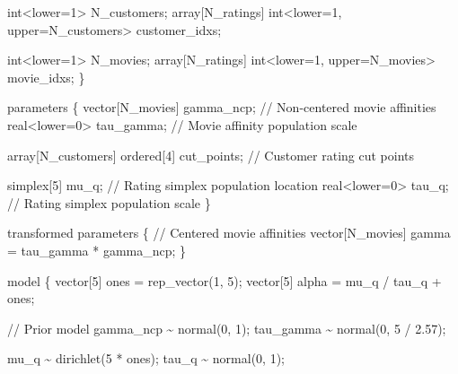 \documentclass[
  letterpaper,
  DIV=11,
  numbers=noendperiod]{scrartcl}
\newenvironment{Shaded}{\begin{snugshade}}{\end{snugshade}}
\newcommand{\CommentTok}[1]{\textcolor[rgb]{0.37,0.37,0.37}{#1}}
\newcommand{\DataTypeTok}[1]{\textcolor[rgb]{0.68,0.00,0.00}{#1}}
\newcommand{\DecValTok}[1]{\textcolor[rgb]{0.68,0.00,0.00}{#1}}
\newcommand{\FloatTok}[1]{\textcolor[rgb]{0.68,0.00,0.00}{#1}}
\newcommand{\KeywordTok}[1]{\textcolor[rgb]{0.00,0.23,0.31}{#1}}
\newcommand{\NormalTok}[1]{\textcolor[rgb]{0.00,0.23,0.31}{#1}}
\begin{document}
\begin{codelisting}
\begin{Shaded}
\begin{Highlighting}[]
  \DataTypeTok{int}\NormalTok{\textless{}}\KeywordTok{lower}\NormalTok{=}\DecValTok{1}\NormalTok{\textgreater{} N\_customers;}
  \DataTypeTok{array}\NormalTok{[N\_ratings] }\DataTypeTok{int}\NormalTok{\textless{}}\KeywordTok{lower}\NormalTok{=}\DecValTok{1}\NormalTok{, }\KeywordTok{upper}\NormalTok{=N\_customers\textgreater{} customer\_idxs;}

  \DataTypeTok{int}\NormalTok{\textless{}}\KeywordTok{lower}\NormalTok{=}\DecValTok{1}\NormalTok{\textgreater{} N\_movies;}
  \DataTypeTok{array}\NormalTok{[N\_ratings] }\DataTypeTok{int}\NormalTok{\textless{}}\KeywordTok{lower}\NormalTok{=}\DecValTok{1}\NormalTok{, }\KeywordTok{upper}\NormalTok{=N\_movies\textgreater{} movie\_idxs;}
\NormalTok{\}}

\KeywordTok{parameters}\NormalTok{ \{}
  \DataTypeTok{vector}\NormalTok{[N\_movies] gamma\_ncp; }\CommentTok{// Non{-}centered movie affinities}
  \DataTypeTok{real}\NormalTok{\textless{}}\KeywordTok{lower}\NormalTok{=}\DecValTok{0}\NormalTok{\textgreater{} tau\_gamma;    }\CommentTok{// Movie affinity population scale}

  \DataTypeTok{array}\NormalTok{[N\_customers] }\DataTypeTok{ordered}\NormalTok{[}\DecValTok{4}\NormalTok{] cut\_points; }\CommentTok{// Customer rating cut points}

  \DataTypeTok{simplex}\NormalTok{[}\DecValTok{5}\NormalTok{] mu\_q;     }\CommentTok{// Rating simplex population location}
  \DataTypeTok{real}\NormalTok{\textless{}}\KeywordTok{lower}\NormalTok{=}\DecValTok{0}\NormalTok{\textgreater{} tau\_q; }\CommentTok{// Rating simplex population scale}
\NormalTok{\}}

\KeywordTok{transformed parameters}\NormalTok{ \{}
  \CommentTok{// Centered movie affinities}
  \DataTypeTok{vector}\NormalTok{[N\_movies] gamma = tau\_gamma * gamma\_ncp;}
\NormalTok{\}}

\KeywordTok{model}\NormalTok{ \{}
  \DataTypeTok{vector}\NormalTok{[}\DecValTok{5}\NormalTok{] ones = rep\_vector(}\DecValTok{1}\NormalTok{, }\DecValTok{5}\NormalTok{);}
  \DataTypeTok{vector}\NormalTok{[}\DecValTok{5}\NormalTok{] alpha = mu\_q / tau\_q + ones;}

  \CommentTok{// Prior model}
\NormalTok{  gamma\_ncp \textasciitilde{} normal(}\DecValTok{0}\NormalTok{, }\DecValTok{1}\NormalTok{);}
\NormalTok{  tau\_gamma \textasciitilde{} normal(}\DecValTok{0}\NormalTok{, }\DecValTok{5}\NormalTok{ / }\FloatTok{2.57}\NormalTok{);}

\NormalTok{  mu\_q \textasciitilde{} dirichlet(}\DecValTok{5}\NormalTok{ * ones);}
\NormalTok{  tau\_q \textasciitilde{} normal(}\DecValTok{0}\NormalTok{, }\DecValTok{1}\NormalTok{);}


\end{Highlighting}
\end{Shaded}
\end{codelisting}
\end{document}
